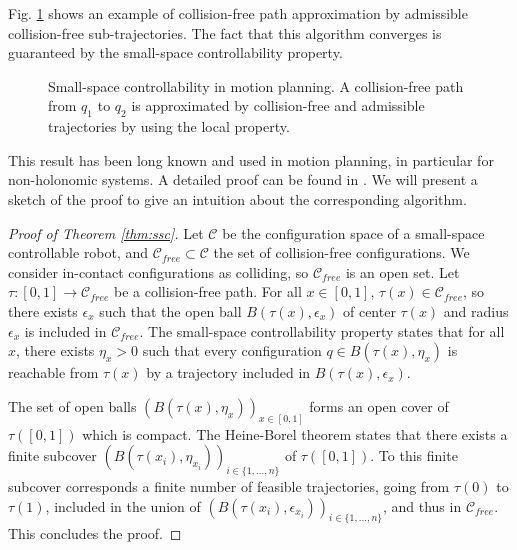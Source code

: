 \documentclass{article}
\begin{document}
Fig. \ref{fig:ssc2} shows an example of collision-free 
path approximation by admissible collision-free sub-trajectories. The fact 
that this algorithm  converges is guaranteed by the small-space
controllability property.

\begin{figure}[h]
  \centering

  

  \caption{Small-space controllability in motion planning. 
    A collision-free path from
    $q_1$ to $q_2$ is approximated by collision-free and admissible
    trajectories by using the local property.
  }
  \label{fig:ssc2}
\end{figure}

This result has been long known and used in motion planning, in particular
for non-holonomic systems. A detailed proof can be found in
\cite{taix-94}. We will present a sketch of the proof to give an intuition about the 
corresponding algorithm.

\begin{proof}[Proof of Theorem \ref{thm:ssc}]
  Let $\mathcal{C}$ be the configuration space of a small-space controllable robot, and 
  $\mathcal{C}_{free} \subset \mathcal{C}$ the set of collision-free configurations. We
  consider in-contact configurations as colliding, so $\mathcal{C}_{free}$ is an open set.
  Let $\tau : [0,1] \rightarrow \mathcal{C}_{free}$ be a collision-free path. For all $x \in [0,1]$,
  $\tau(x) \in \mathcal{C}_{free}$, so there exists $\epsilon_x$ such that the open ball 
  $B(\tau(x),\epsilon_x)$ of center $\tau(x)$ and radius $\epsilon_x$ is included in 
  $\mathcal{C}_{free}$. The small-space controllability property states that for all $x$,
  there exists $\eta_x > 0$ such that every configuration $q \in B(\tau(x),\eta_x)$ is reachable 
  from $\tau(x)$ by a trajectory included in $B(\tau(x),\epsilon_x)$.

  The set of open balls $\left( B(\tau(x),\eta_x) \right)_{x\in [0,1]}$ forms an open cover
  of $\tau([0,1])$ which is compact. The Heine-Borel theorem states that there exists a
  finite subcover $\left( B(\tau(x_i),\eta_{x_i}) \right)_{i\in \{ 1,\dots ,n \}}$ of $\tau([0,1])$. To this
  finite subcover corresponds a finite number of feasible trajectories, going from $\tau(0)$ to  
  $\tau(1)$, included in the union of 
  $\left( B(\tau(x_i),\epsilon_{x_i}) \right)_{i\in \{ 1,\dots ,n \}}$, and thus in 
  $\mathcal{C}_{free}$. This concludes the proof.
\end{proof}
\end{document}
